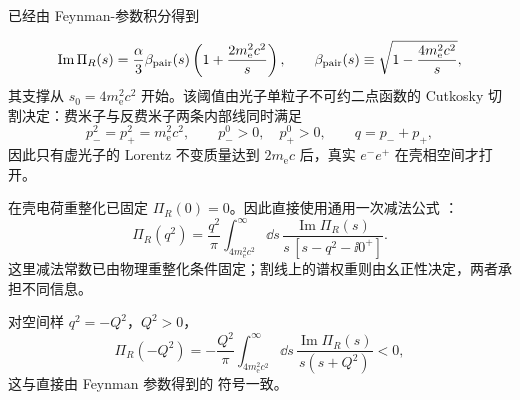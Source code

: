 \begin{derivation}[由产生谱重建空间样真空极化]
已经由 Feynman-参数积分得到

\begin{equation*}
 \operatorname{Im}\Pi_R(s)
 =\frac{\alpha}{3}
 \beta_{\rm pair}(s)\left(1+\frac{2m_{\mathrm e}^2c^2}{s}\right),
 \qquad
 \beta_{\rm pair}(s)\equiv\sqrt{1-\frac{4m_{\mathrm e}^2c^2}{s}},
 \end{equation*}
其支撑从 $s_0=4m_{\mathrm e}^2c^2$ 开始。该阈值由光子单粒子不可约二点函数的 Cutkosky 切割决定：费米子与反费米子两条内部线同时满足
\begin{equation*}
 p_-^2=p_+^2=m_{\mathrm e}^2c^2,
 \qquad
 p_-^0>0,\quad p_+^0>0,
 \qquad
 q=p_-+p_+,
\end{equation*}
因此只有虚光子的 Lorentz 不变质量达到 $2m_{\mathrm e} c$ 后，真实 $e^-e^+$ 在壳相空间才打开。

在壳电荷重整化已固定 $\Pi_R(0)=0$。因此直接使用通用一次减法公式 ：
\begin{equation*}
 {
 \Pi_R(q^2)
 =\frac{q^2}{\pi}
 \int_{4m_{\mathrm e}^2c^2}^{\infty}\dd s\,
 \frac{\operatorname{Im}\Pi_R(s)}
 {s\,[s-q^2-\ii0^+]}.}
 \end{equation*}
这里减法常数已由物理重整化条件固定；割线上的谱权重则由幺正性决定，两者承担不同信息。

对空间样 $q^2=-Q^2$，$Q^2>0$，
\begin{equation*}
 \Pi_R(-Q^2)
 =-\frac{Q^2}{\pi}
 \int_{4m_{\mathrm e}^2c^2}^{\infty}\dd s\,
 \frac{\operatorname{Im}\Pi_R(s)}{s(s+Q^2)}<0,
 \end{equation*}
这与直接由 Feynman 参数得到的  符号一致。
\end{derivation}

